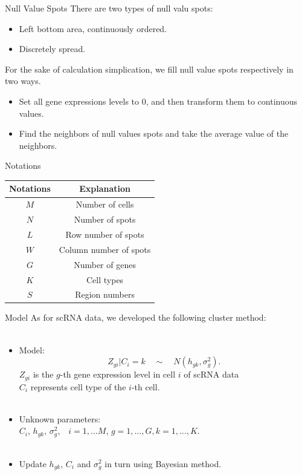 \documentclass[10 pt]{beamer}
\begin{document}
\begin{frame}{Null Value Spots}
There are two types of null valu spots:
\begin{itemize}
	\item Left bottom area, continuously ordered.
	\item Discretely spread.
	\end{itemize}
For the sake of calculation simplication, we fill  null value spots respectively in two ways.
\begin{itemize}
	\item Set all gene expressions levels to 0, and then transform them to continuous values.
	\item Find the neighbors of null values spots and take the average value of the neighbors.
\end{itemize}
\end{frame}

\begin{frame}{Notations}
\begin{table}
\begin{tabular}{c|c}
	\hline
	Notations & Explanation \\
	\hline
	$M$ & Number of cells \\
	\hline
	$N$ & Number of spots \\
	\hline
	$L$ & Row number of spots \\
	\hline 
	$W$ & Column number of spots \\
	\hline
	$G$ & Number of genes \\
	\hline
	$K$ & Cell types \\
	\hline 
	$S$ &Region numbers\\
	\hline
	
\end{tabular}
\end{table}
\end{frame}

\begin{frame}{Model}
As for scRNA data, we developed the following cluster method:
~\\
~\\
\begin{itemize}
	\item Model: $$Z_{gi}|C_i = k \quad \sim\quad N(h_{gk}, \sigma^2_g).$$
	$Z_{gi}$ is the $g$-th gene expression level in cell $i$ of scRNA data\\
$C_i$ represents cell type of the $i$-th cell.
~\\
~\\
\item Unknown parameters: \\
$C_i$,  $ h_{gk} $, $ \sigma^2_g$,$\quad i = 1,\dots M$, $g = 1,\dots,G, k = 1,\dots, K$.
~\\
~\\
\item Update $h_{gk}$, $C_i$ and $\sigma^2_g$ in turn using Bayesian method.
\end{itemize}
\end{frame}
\end{document}
